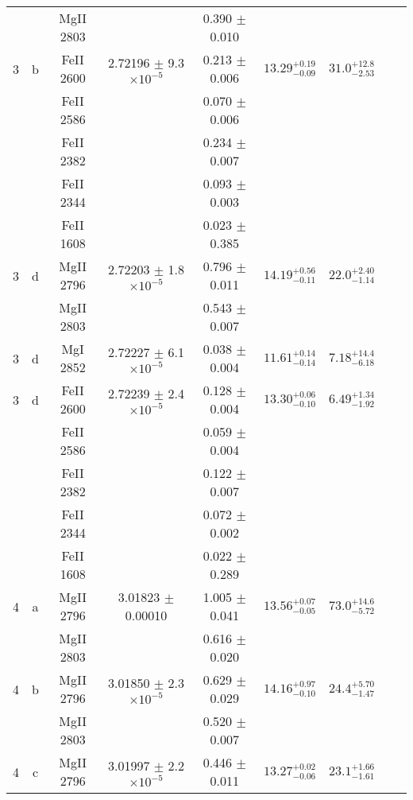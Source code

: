 \documentclass[12pt]{article}
\begin{document}
\begin{footnotesize}
\begin{longtable}{ c c c c c c c c c}
  &   & MgII     2803  &  &  0.390 $\pm$ 0.010   &   &     & 	 & \\ 
       3  & b  & FeII     2600  &  2.72196 $\pm$ 9.3 $\times 10^{-5}$   &  0.213 $\pm$ 0.006   & $13.29_{ - 0.09}^{ + 0.19}$  & $31.0_{ - 2.53}^{ + 12.8}$    & 	 & \\ 
  &   & FeII     2586  &  &  0.070 $\pm$ 0.006   &   &     & 	 & \\ 
  &   & FeII     2382  &  &  0.234 $\pm$ 0.007   &   &     & 	 & \\ 
  &   & FeII     2344  &  &  0.093 $\pm$ 0.003   &   &     & 	 & \\ 
  &   & FeII     1608  &  &  0.023 $\pm$ 0.385   &   &     & 	 & \\ 
       3  & d  & MgII     2796  &  2.72203 $\pm$ 1.8 $\times 10^{-5}$   &  0.796 $\pm$ 0.011   & $14.19_{ - 0.11}^{ + 0.56}$  & $22.0_{ - 1.14}^{ + 2.40}$    & 	 & \\ 
  &   & MgII     2803  &  &  0.543 $\pm$ 0.007   &   &     & 	 & \\ 
       3  & d  & MgI     2852  &  2.72227 $\pm$ 6.1 $\times 10^{-5}$   &  0.038 $\pm$ 0.004   & $11.61_{ - 0.14}^{ + 0.14}$  & $7.18_{ - 6.18}^{ + 14.4}$    & 	 & \\ 
       3  & d  & FeII     2600  &  2.72239 $\pm$ 2.4 $\times 10^{-5}$   &  0.128 $\pm$ 0.004   & $13.30_{ - 0.10}^{ + 0.06}$  & $6.49_{ - 1.92}^{ + 1.34}$    & 	 & \\ 
  &   & FeII     2586  &  &  0.059 $\pm$ 0.004   &   &     & 	 & \\ 
  &   & FeII     2382  &  &  0.122 $\pm$ 0.007   &   &     & 	 & \\ 
  &   & FeII     2344  &  &  0.072 $\pm$ 0.002   &   &     & 	 & \\ 
  &   & FeII     1608  &  &  0.022 $\pm$ 0.289   &   &     & 	 & \\ 
       4  & a  & MgII     2796  &  3.01823 $\pm$ 0.00010  &  1.005 $\pm$ 0.041   & $13.56_{ - 0.05}^{ + 0.07}$  & $73.0_{ - 5.72}^{ + 14.6}$    & 	 & \\ 
  &   & MgII     2803  &  &  0.616 $\pm$ 0.020   &   &     & 	 & \\ 
       4  & b  & MgII     2796  &  3.01850 $\pm$ 2.3 $\times 10^{-5}$   &  0.629 $\pm$ 0.029   & $14.16_{ - 0.10}^{ + 0.97}$  & $24.4_{ - 1.47}^{ + 5.70}$    & 	 & \\ 
  &   & MgII     2803  &  &  0.520 $\pm$ 0.007   &   &     & 	 & \\ 
       4  & c  & MgII     2796  &  3.01997 $\pm$ 2.2 $\times 10^{-5}$   &  0.446 $\pm$ 0.011   & $13.27_{ - 0.06}^{ + 0.02}$  & $23.1_{ - 1.61}^{ + 1.66}$    & 	 & \\ 

\end{longtable}
\end{footnotesize}
\end{document}
